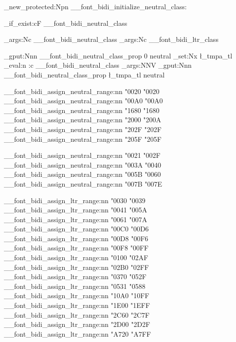\cs_new_protected:Npn \__font_bidi_initialize_neutral_class:
  {
    \cs_if_exist:cF { __font_bidi_neutral_class }
      {
        \exp_args:Nc \newXeTeXintercharclass
          { __font_bidi_neutral_class }
        \exp_args:Nc \newXeTeXintercharclass
          { __font_bidi_ltr_class }

        \prop_gput:Nnn \g__font_bidi_neutral_class_prop { 0 } { neutral }
        \tl_set:Nx \l_tmpa_tl
          { \int_eval:n { \use:c { __font_bidi_neutral_class } } }
        \exp_args:NNV \prop_gput:Nnn
          \g__font_bidi_neutral_class_prop \l_tmpa_tl { neutral }

        \__font_bidi_assign_neutral_range:nn { "0020 } { "0020 }
        \__font_bidi_assign_neutral_range:nn { "00A0 } { "00A0 }
        \__font_bidi_assign_neutral_range:nn { "1680 } { "1680 }
        \__font_bidi_assign_neutral_range:nn { "2000 } { "200A }
        \__font_bidi_assign_neutral_range:nn { "202F } { "202F }
        \__font_bidi_assign_neutral_range:nn { "205F } { "205F }

        \__font_bidi_assign_neutral_range:nn { "0021 } { "002F }
        \__font_bidi_assign_neutral_range:nn { "003A } { "0040 }
        \__font_bidi_assign_neutral_range:nn { "005B } { "0060 }
        \__font_bidi_assign_neutral_range:nn { "007B } { "007E }

        \__font_bidi_assign_ltr_range:nn { "0030 } { "0039 }
        \__font_bidi_assign_ltr_range:nn { "0041 } { "005A }
        \__font_bidi_assign_ltr_range:nn { "0061 } { "007A }
        \__font_bidi_assign_ltr_range:nn { "00C0 } { "00D6 }
        \__font_bidi_assign_ltr_range:nn { "00D8 } { "00F6 }
        \__font_bidi_assign_ltr_range:nn { "00F8 } { "00FF }
        \__font_bidi_assign_ltr_range:nn { "0100 } { "02AF }
        \__font_bidi_assign_ltr_range:nn { "02B0 } { "02FF }
        \__font_bidi_assign_ltr_range:nn { "0370 } { "052F }
        \__font_bidi_assign_ltr_range:nn { "0531 } { "0588 }
        \__font_bidi_assign_ltr_range:nn { "10A0 } { "10FF }
        \__font_bidi_assign_ltr_range:nn { "1E00 } { "1EFF }
        \__font_bidi_assign_ltr_range:nn { "2C60 } { "2C7F }
        \__font_bidi_assign_ltr_range:nn { "2D00 } { "2D2F }
        \__font_bidi_assign_ltr_range:nn { "A720 } { "A7FF }

}}
